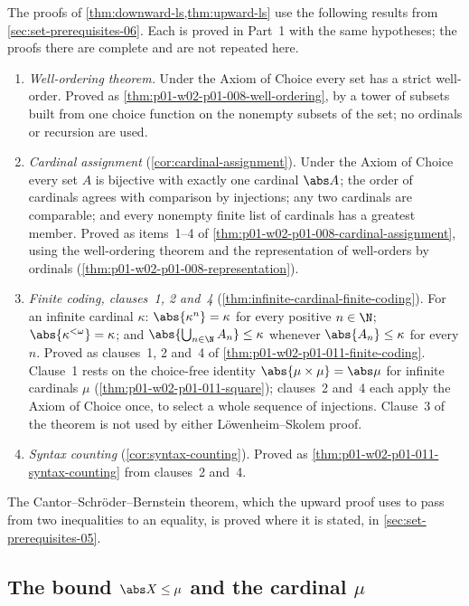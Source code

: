 The proofs of \cref{thm:downward-ls,thm:upward-ls} use the following
results from \cref{sec:set-prerequisites-06}. Each is proved in Part~1 with
the same hypotheses; the proofs there are complete and are not repeated
here.
\begin{enumerate}
  \item \emph{Well-ordering theorem.} Under the Axiom of Choice every set
        has a strict well-order. Proved as
        \cref{thm:p01-w02-p01-008-well-ordering}, by a tower of subsets
        built from one choice function on the nonempty subsets of the set;
        no ordinals or recursion are used.
  \item \emph{Cardinal assignment} (\cref{cor:cardinal-assignment}). Under
        the Axiom of Choice every set \(A\) is bijective with exactly one
        cardinal \(\abs A\); the order of cardinals agrees with comparison by
        injections; any two cardinals are comparable; and every nonempty
        finite list of cardinals has a greatest member. Proved as items~1--4
        of \cref{thm:p01-w02-p01-008-cardinal-assignment}, using the
        well-ordering theorem and the representation of well-orders by
        ordinals (\cref{thm:p01-w02-p01-008-representation}).
  \item \emph{Finite coding, clauses~1, 2 and~4}
        (\cref{thm:infinite-cardinal-finite-coding}). For an infinite
        cardinal \(\kappa\): \(\abs{\kappa^n}=\kappa\) for every positive
        \(n\in\N\); \(\abs{\kappa^{<\omega}}=\kappa\); and
        \(\abs{\bigcup_{n\in\N}A_n}\leq\kappa\) whenever
        \(\abs{A_n}\leq\kappa\) for every \(n\). Proved as clauses~1, 2
        and~4 of \cref{thm:p01-w02-p01-011-finite-coding}. Clause~1 rests on
        the choice-free identity \(\abs{\mu\times\mu}=\abs\mu\) for infinite
        cardinals \(\mu\) (\cref{thm:p01-w02-p01-011-square}); clauses~2
        and~4 each apply the Axiom of Choice once, to select a whole
        sequence of injections. Clause~3 of the theorem is not used by
        either L\"owenheim--Skolem proof.
  \item \emph{Syntax counting} (\cref{cor:syntax-counting}). Proved as
        \cref{thm:p01-w02-p01-011-syntax-counting} from clauses~2 and~4.
\end{enumerate}
The Cantor--Schr\"oder--Bernstein theorem, which the upward proof uses to
pass from two inequalities to an equality, is proved where it is stated, in
\cref{sec:set-prerequisites-05}.

\subsection{The bound \texorpdfstring{\(\abs X\leq\mu\)}{|X| <= mu} and the cardinal \texorpdfstring{\(\mu\)}{mu}}
\label{sec:p02-w02b-p02-029-bound}

